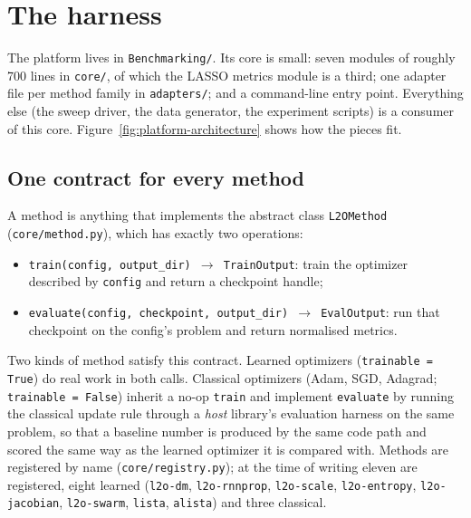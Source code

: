 \section{The harness}
\label{sec:platform-harness}

The platform lives in \texttt{Benchmarking/}. Its core is small: seven
modules of roughly 700 lines in \texttt{core/}, of which the LASSO metrics
module is a third; one adapter file per method family in
\texttt{adapters/}; and a command-line entry point. Everything else
(the sweep driver, the data generator, the experiment scripts) is a consumer
of this core. Figure~\ref{fig:platform-architecture} shows how the pieces fit.



\subsection{One contract for every method}

A method is anything that implements the abstract class \texttt{L2OMethod}
(\texttt{core/method.py}), which has exactly two operations:
\begin{itemize}
  \item \texttt{train(config, output\_dir) $\to$ TrainOutput}: train the
    optimizer described by \texttt{config} and return a checkpoint handle;
  \item \texttt{evaluate(config, checkpoint, output\_dir) $\to$ EvalOutput}:
    run that checkpoint on the config's problem and return normalised
    metrics.
\end{itemize}
Two kinds of method satisfy this contract. Learned optimizers
(\texttt{trainable = True}) do real work in both calls. Classical optimizers
(Adam, SGD, Adagrad; \texttt{trainable = False}) inherit a no-op
\texttt{train} and implement \texttt{evaluate} by running the classical
update rule through a \emph{host} library's evaluation harness on the same
problem, so that a baseline number is produced by the same code path and
scored the same way as the learned optimizer it is compared with. Methods are
registered by name (\texttt{core/registry.py}); at the time of writing eleven
are registered, eight learned (\texttt{l2o-dm}, \texttt{l2o-rnnprop},
\texttt{l2o-scale}, \texttt{l2o-entropy}, \texttt{l2o-jacobian},
\texttt{l2o-swarm}, \texttt{lista}, \texttt{alista}) and three classical.

